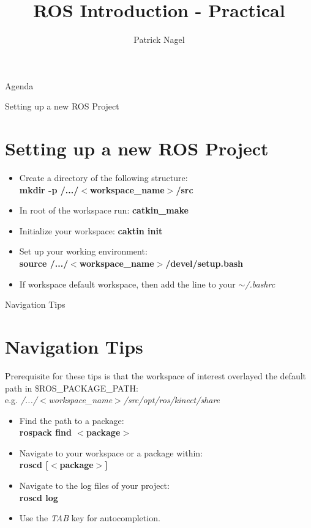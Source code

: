 \documentclass[11pt]{beamer}
\author{Patrick Nagel}
\title{ROS Introduction - Practical}
\institute{University of Applied Sciences Bonn-Rhein-Sieg}
\begin{document}
	\begin{frame}
		\titlepage
	\end{frame}

	\begin{frame}{Agenda}
		\tableofcontents
	\end{frame}

	\begin{frame}{Setting up a new ROS Project}
		\section{Setting up a new ROS Project}
		\begin{itemize}
			\item{Create a directory of the following structure:\\
			\textbf{mkdir -p /.../$<$workspace\_name$>$/src}}
			\item{In root of the workspace run: \textbf{catkin\_make}}
			\item{Initialize your workspace: \textbf{caktin init}}
			\item{Set up your working environment:\\ 
		\textbf{source /.../$<$workspace\_name$>$/devel/setup.bash}}
			\item{If workspace default workspace, then add the line to your \textit{$\sim$/.bashrc}}
		\end{itemize}
	\end{frame}

	\begin{frame}{Navigation Tips}
		\section{Navigation Tips}
		Prerequisite for these tips is that the workspace of interest overlayed the default path in \$ROS\_PACKAGE\_PATH:\\
	e.g. \textit{/.../$<$workspace\_name$>$/src/opt/ros/kinect/share}

		\begin{itemize}
			\item{Find the path to a package:\\	\textbf{rospack find $<$package$>$}}
			\item{Navigate to your workspace or a package within:\\ \textbf{roscd [$<$package$>$]}}
			\item{Navigate to the log files of your project:\\ \textbf{roscd log}}
			\item{Use the \textit{TAB} key for autocompletion.}
		\end{itemize}
	\end{frame}
\end{document}
